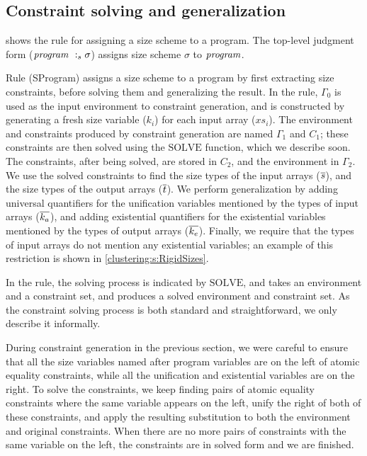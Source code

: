 \subsection{Constraint solving and generalization}
 shows the rule for assigning a size scheme to a program.
The top-level judgment form ($\mathit{program} ~:_{s} \sigma$) assigns size scheme $\sigma$ to $\mathit{program}$.



Rule (SProgram) assigns a size scheme to a program by first extracting size constraints, before solving them and generalizing the result.
In the rule, $\Gamma_0$ is used as the input environment to constraint generation, and is constructed by generating a fresh size variable ($k_i$) for each input array ($xs_i$).
The environment and constraints produced by constraint generation are named $\Gamma_1$ and $C_1$; these constraints are then solved using the $\textrm{SOLVE}$ function, which we describe soon.
The constraints, after being solved, are stored in $C_2$, and the environment in $\Gamma_2$.
We use the solved constraints to find the size types of the input arrays ($\overline{s}$), and the size types of the output arrays ($\overline{t}$).
We perform generalization by adding universal quantifiers for the unification variables mentioned by the types of input arrays ($\overline{k_a}$), and adding existential quantifiers for the existential variables mentioned by the types of output arrays ($\overline{k_e}$).
Finally, we require that the types of input arrays do not mention any existential variables; an example of this restriction is shown in \cref{clustering:s:RigidSizes}.

In the rule, the solving process is indicated by $\textrm{SOLVE}$, and takes an environment and a constraint set, and produces a solved environment and constraint set.
As the constraint solving process is both standard and straightforward, we only describe it informally.

During constraint generation in the previous section, we were careful to ensure that all the size variables named after program variables are on the left of atomic equality constraints, while all the unification and existential variables are on the right.
To solve the constraints, we keep finding pairs of atomic equality constraints where the same variable appears on the left, unify the right of both of these constraints, and apply the resulting substitution to both the environment and original constraints.
When there are no more pairs of constraints with the same variable on the left, the constraints are in solved form and we are finished.

